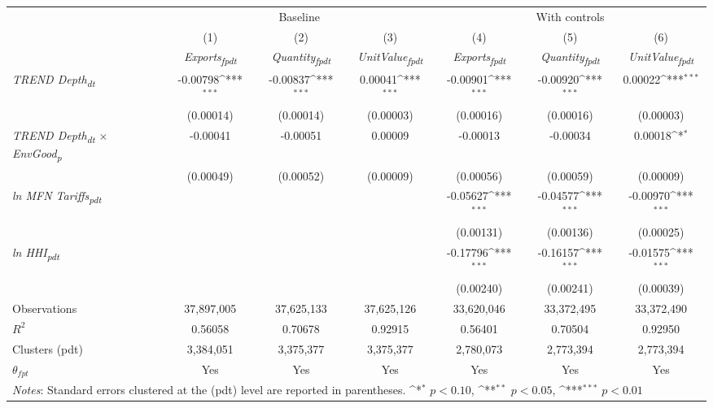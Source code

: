 {
\def\sym#1{\ifmmode^{#1}\else\(^{#1}\)\fi}
\begin{tabular}{l*{6}{c}}
\toprule
&\multicolumn{3}{c}{Baseline}&\multicolumn{3}{c}{With controls}\\\cmidrule(lr){2-4}\cmidrule(lr){5-7}
&(1)&(2)&(3)&(4)&(5)&(6)\\
&\textit{Exports\textsubscript{fpdt}}&\textit{Quantity\textsubscript{fpdt}}&\textit{UnitValue\textsubscript{fpdt}}&\textit{Exports\textsubscript{fpdt}}&\textit{Quantity\textsubscript{fpdt}}&\textit{UnitValue\textsubscript{fpdt}}\\
\midrule
\textit{TREND Depth\textsubscript{dt}} & -0.00798\sym{***} & -0.00837\sym{***} & 0.00041\sym{***} & -0.00901\sym{***} & -0.00920\sym{***} & 0.00022\sym{***}\\
 & (0.00014) & (0.00014) & (0.00003) & (0.00016) & (0.00016) & (0.00003)\\
\addlinespace
\textit{TREND Depth\textsubscript{dt} $\times$ EnvGood\textsubscript{p}} & -0.00041 & -0.00051 & 0.00009 & -0.00013 & -0.00034 & 0.00018\sym{*}\\
 & (0.00049) & (0.00052) & (0.00009) & (0.00056) & (0.00059) & (0.00009)\\
\addlinespace
\textit{ln MFN Tariffs\textsubscript{pdt}} &  &  &  & -0.05627\sym{***} & -0.04577\sym{***} & -0.00970\sym{***}\\
 &  &  &  & (0.00131) & (0.00136) & (0.00025)\\
\addlinespace
\textit{ln HHI\textsubscript{pdt}} &  &  &  & -0.17796\sym{***} & -0.16157\sym{***} & -0.01575\sym{***}\\
 &  &  &  & (0.00240) & (0.00241) & (0.00039)\\
\midrule
Observations & 37,897,005 & 37,625,133 & 37,625,126 & 33,620,046 & 33,372,495 & 33,372,490\\
$R^{2}$ & 0.56058 & 0.70678 & 0.92915 & 0.56401 & 0.70504 & 0.92950\\
Clusters (pdt) & 3,384,051 & 3,375,377 & 3,375,377 & 2,780,073 & 2,773,394 & 2,773,394\\
$\theta_{fpt}$ & Yes & Yes & Yes & Yes & Yes & Yes\\
\bottomrule
\multicolumn{7}{l}{\footnotesize \textit{Notes}: Standard errors clustered at the (pdt) level are reported in parentheses. \sym{*} \(p<0.10\), \sym{**} \(p<0.05\), \sym{***} \(p<0.01\)}\\
\end{tabular}
}
